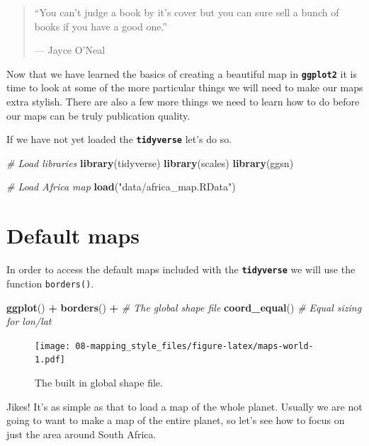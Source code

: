 \documentclass[]{book}
\newenvironment{Shaded}{\begin{snugshade}}{\end{snugshade}}
\newcommand{\KeywordTok}[1]{\textcolor[rgb]{0.13,0.29,0.53}{\textbf{#1}}}
\newcommand{\StringTok}[1]{\textcolor[rgb]{0.31,0.60,0.02}{#1}}
\newcommand{\CommentTok}[1]{\textcolor[rgb]{0.56,0.35,0.01}{\textit{#1}}}
\newcommand{\OperatorTok}[1]{\textcolor[rgb]{0.81,0.36,0.00}{\textbf{#1}}}
\newcommand{\NormalTok}[1]{#1}
\theoremstyle{definition}
\theoremstyle{definition}
\theoremstyle{definition}
\theoremstyle{remark}
\begin{document}
\begin{quote}
``You can't judge a book by it's cover but you can sure sell a bunch of
books if you have a good one.''

--- Jayce O'Neal
\end{quote}

Now that we have learned the basics of creating a beautiful map in
\textbf{\texttt{ggplot2}} it is time to look at some of the more
particular things we will need to make our maps extra stylish. There are
also a few more things we need to learn how to do before our maps can be
truly publication quality.

If we have not yet loaded the \textbf{\texttt{tidyverse}} let's do so.

\begin{Shaded}
\begin{Highlighting}[]
\CommentTok{# Load libraries}
\KeywordTok{library}\NormalTok{(tidyverse)}
\KeywordTok{library}\NormalTok{(scales)}
\KeywordTok{library}\NormalTok{(ggsn)}

\CommentTok{# Load Africa map}
\KeywordTok{load}\NormalTok{(}\StringTok{"data/africa_map.RData"}\NormalTok{)}
\end{Highlighting}
\end{Shaded}

\section{Default maps}\label{default-maps}

In order to access the default maps included with the
\textbf{\texttt{tidyverse}} we will use the function \texttt{borders()}.

\begin{Shaded}
\begin{Highlighting}[]
\KeywordTok{ggplot}\NormalTok{() }\OperatorTok{+}
\StringTok{  }\KeywordTok{borders}\NormalTok{() }\OperatorTok{+}\StringTok{ }\CommentTok{# The global shape file}
\StringTok{  }\KeywordTok{coord_equal}\NormalTok{() }\CommentTok{# Equal sizing for lon/lat }
\end{Highlighting}
\end{Shaded}

\begin{figure}
\centering
\texttt{[image: 08-mapping\_style\_files/figure-latex/maps-world-1.pdf]}
\caption{\label{fig:maps-world}The built in global shape file.}
\end{figure}

Jikes! It's as simple as that to load a map of the whole planet. Usually
we are not going to want to make a map of the entire planet, so let's
see how to focus on just the area around South Africa.
\end{document}
